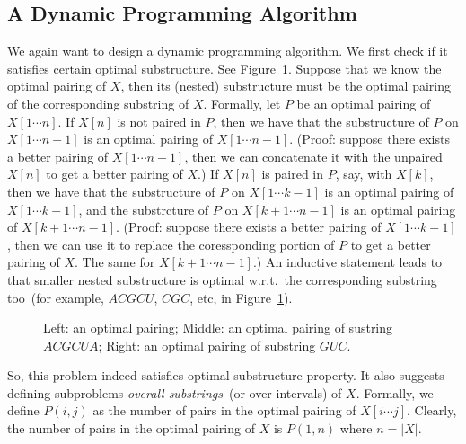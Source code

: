 \subsection*{A Dynamic Programming Algorithm}

We again want to design a dynamic programming algorithm.
We first check if it satisfies certain optimal substructure.
See Figure~\ref{fig:optimal}.
Suppose that we know the optimal pairing of $X$,
then its (nested) substructure must be the optimal
pairing of the corresponding substring of $X$.
Formally, let $P$ be an optimal pairing of $X[1\cdots n]$.
If $X[n]$ is not paired in $P$, then we have that
the substructure of $P$ on $X[1\cdots n - 1]$ is an optimal
pairing of $X[1\cdots n - 1]$. (Proof: suppose there exists
a better pairing of $X[1\cdots n - 1]$, then we can concatenate
it with the unpaired $X[n]$ to get a better pairing of $X$.)
If $X[n]$ is paired in $P$, say, with $X[k]$, then we have that
the substructure of $P$ on $X[1\cdots k - 1]$ is an optimal
pairing of $X[1\cdots k - 1]$, and 
the substrcture of $P$ on $X[k + 1\cdots n - 1]$ is an optimal
pairing of $X[k + 1\cdots n - 1]$. 
(Proof: suppose there exists
a better pairing of $X[1\cdots k - 1]$, then we can use it to replace
the coressponding portion of $P$ to 
get a better pairing of $X$. The same for $X[k + 1\cdots n - 1]$.)
An inductive statement leads to that smaller nested substructure
is optimal w.r.t.\ the corresponding substring too~(for example, 
		$ACGCU$, $CGC$, etc, in Figure~\ref{fig:optimal}).

\begin{figure}[h]
\centering{}
\caption{Left: an optimal pairing; Middle: an optimal pairing of sustring $ACGCUA$; Right: 
an optimal pairing of substring $GUC$.}
\label{fig:optimal}
\end{figure}

So, this problem indeed satisfies optimal substructure property.
It also suggests defining subproblems \emph{overall substrings}~(or over intervals) of $X$.
Formally, we define $P(i,j)$ as the number of pairs in the optimal pairing of $X[i\cdots j]$.
Clearly, the number of pairs in the optimal pairing of $X$ is $P(1,n)$ where $n = |X|$.

